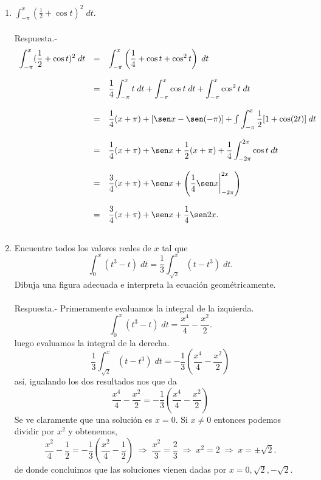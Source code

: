 \begin{enumerate}[\bfseries  1.]
    \item $\displaystyle\int_{-\pi}^{x}(\frac{1}{2}+\cos t)^2\; dt$.\\\\
	Respuesta.-\;
	$$\begin{array}{rcl}
	    \displaystyle\int_{-\pi}^{x}(\frac{1}{2}+\cos t)^2\; dt&=&\displaystyle\int_{-\pi}^{x}\left(\dfrac{1}{4}+\cos t + \cos^2 t\right)\; dt\\\\
								   &=&\dfrac{1}{4}\displaystyle\int_{-\pi}^{x} t \; dt +\int_{-\pi}^{x} \cos t\; dt + \int_{-\pi}^x \cos^2 t \; dt\\\\
								   &=&\dfrac{1}{4}(x+\pi)+[\sen x - \sen (-\pi)] + \int \displaystyle\int_{-\pi}^x \dfrac{1}{2}[1+\cos(2t)]\; dt\\\\
								   &=&\dfrac{1}{4}(x+\pi) + \sen x + \dfrac{1}{2}(x+\pi)+\dfrac{1}{4}\displaystyle\int_{-2\pi}^{2x}\cos t\; dt\\\\
								   &=&\dfrac{3}{4}(x+\pi) + \sen x + \left(\dfrac{1}{4}\sen x\bigg|_{-2\pi}^{2x}\right)\\\\

								   &=&\dfrac{3}{4}(x+\pi)+\sen x + \dfrac{1}{4}\sen 2x.\\\\
	\end{array}$$

    \item Encuentre todos los valores reales de $x$ tal que 
	$$\int_0^x (t^3-t)\; dt = \dfrac{1}{3}\int_{\sqrt{2}}^x (t-t^3)\; dt.$$
	Dibuja una figura adecuada e interpreta la ecuación geométricamente. \\\\

	Respuesta.-\; Primeramente evaluamos la integral de la izquierda.
	$$\int_0^x (t^3-t)\; dt = \dfrac{x^4}{4}-\dfrac{x^2}{2}.$$
	luego evaluamos la integral de la derecha.
	$$\dfrac{1}{3}\int_{\sqrt{2}}^x (t-t^3)\; dt = -\dfrac{1}{3}\left(\dfrac{x^4}{4}-\dfrac{x^2}{2}\right)$$
	así, igualando los dos resultados nos que da
	$$\dfrac{x^4}{4}-\dfrac{x^2}{2} = -\dfrac{1}{3}\left(\dfrac{x^4}{4}-\dfrac{x^2}{2}\right)$$
	Se ve claramente que una solución es $x=0$. Si $x\neq 0$ entonces podemos dividir por $x^2$ y obtenemos,
	$$\dfrac{x^2}{4}-\dfrac{1}{2}=-\dfrac{1}{3}\left(\dfrac{x^2}{4}-\dfrac{1}{2}\right)\; \Longrightarrow \; \dfrac{x^2}{3}=\dfrac{2}{3}\; \Longrightarrow\; x^2=2 \; \Longrightarrow\; x=\pm\sqrt{2}.$$
	de donde concluimos que las soluciones vienen dadas por $x=0,\sqrt{2},-\sqrt{2}.$\\\\


\end{enumerate}
